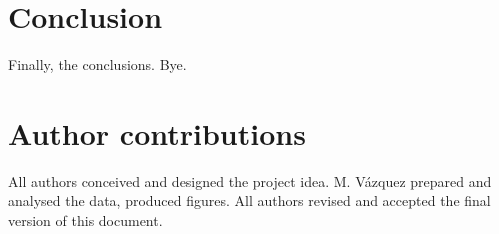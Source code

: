 \documentclass{Template resources/netsci-project}
\begin{document}


\clearpage
\section{Conclusion}
Finally, the conclusions. Bye.


\clearpage
\printbibliography

\newpage
\section*{Author contributions}
All authors conceived and designed the project idea. M. Vázquez prepared and analysed the data, produced figures. All authors revised and accepted the final version of this document.

\end{document}
